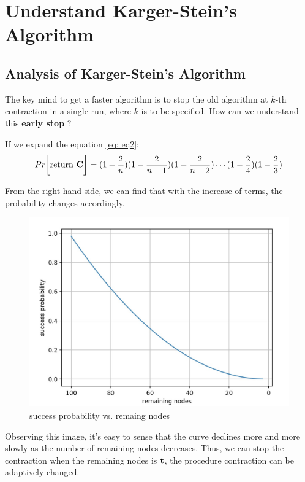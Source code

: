 \documentclass[a4paper, 12pt, titlepage]{article}
\begin{document}
\section{Understand Karger-Stein's Algorithm}

\subsection{Analysis of Karger-Stein's Algorithm}
The key mind to get a faster algorithm is to stop the old algorithm at $k$-th contraction in a single run, where $k$ is to be specified.
How can we understand this \textbf{early stop} ? 

If we expand the equation \ref{eq: eq2}:
\begin{equation}\label{eq: eq4}
    Pr \bigg[ \text{return \textbf{C}} \bigg] = (1 - \frac{2}{n})(1 - \frac{2}{n - 1})(1 - \frac{2}{n - 2}) \cdots (1- \frac{2}{4})(1 - \frac{2}{3})
\end{equation}

From the right-hand side, we can find that with the increase of terms, the probability changes accordingly.
\begin{figure}[h]
    \centering
    \includegraphics[scale=0.3]{images/min-cut-pic1.png}
    \caption{success probability vs. remaing nodes}
    \label{fig:fig1}
\end{figure}

Observing this image, it's easy to sense that the curve declines more and more slowly as the number of remaining nodes decreases.
Thus, we can stop the contraction when the remaining nodes is ${\bf t}$, the procedure contraction can be adaptively changed.
\end{document}
